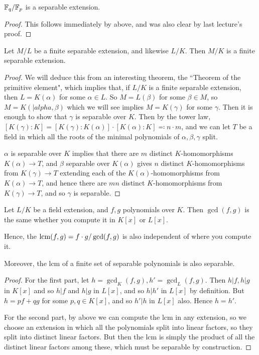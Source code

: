 \documentclass[10pt,a4paper]{article}
\begin{document}
\begin{corollary}
$\mathbb{F}_q / \mathbb{F}_p$ is a separable extension.
\end{corollary}
\begin{proof}
This follows immediately by above, and was also clear by last lecture's proof.
\end{proof}
\begin{proposition}
Let $M/L$ be a finite separable extension, and likewise $L/K$. Then $M/K$ is a finite separable extension.
\end{proposition}
\begin{proof}
We will deduce this from an interesting theorem, the ``Theorem of the primitive element", which implies that, if $L/K$ is a finite separable extension, then $L = K(\alpha)$ for some $\alpha \in L$. So $M = L(\beta)$ for some $\beta \in M$, so $M = K(|alpha, \beta)$ which we will see implies $M = K(\gamma)$ for some $\gamma$. Then it is enough to show that $\gamma$ is separable over $K$. Then by the tower law, $[K(\gamma):K] = [K(\gamma):K(\alpha)]\cdot [K(\alpha):K] \eqqcolon n\cdot m$, and we can let $T$ be a field in which all the roots of the minimal polynomials of $\alpha, \beta, \gamma$ split.

$\alpha$ is separable over $K$ implies that there are $m$ distinct $K$-homomorphisms $K(\alpha) \to T$, and $\beta$ separable over $K(\alpha)$ gives $n$ distinct $K$-homomorphisms from $K(\gamma) \to T$ extending each of the $K(\alpha)$-homomorphisms from $K(\alpha)\to T$, and hence there are $mn$ distinct $K$-homomorphisms from $K(\gamma) \to T$, and so $\gamma$ is separable.
\end{proof}

\begin{lemma}
Let $L/K$ be a field extension, and $f, g$ polynomials over $K$. Then $\gcd(f,g)$ is the same whether you compute it in $K[x]$ or $L[x]$.

Hence, the $\operatorname{lcm}(f,g) = f\cdot g / \gcd(f,g)$ is also independent of where you compute it.

Moreover, the lcm of a finite set of separable polynomials is also separable.
\end{lemma}
\begin{proof}
For the first part, let $h=\gcd_K(f,g), h' = \gcd_L(f,g)$. Then $h|f, h|g$ in $K[x]$ and so $h|f$ and $h|g$ in $L[x]$, and so $h|h'$ in $L[x]$ by definition. But $h = pf+qg$ for some $p,q \in K[x]$, and so $h'|h$ in $L[x]$ also. Hence $h=h'$.

For the second part, by above we can compute the lcm in any extension, so we choose an extension in which all the polynomials split into linear factors, so they split into distinct linear factors. But then the lcm is simply the product of all the distinct linear factors among these, which must be separable by construction.
\end{proof}
\end{document}

